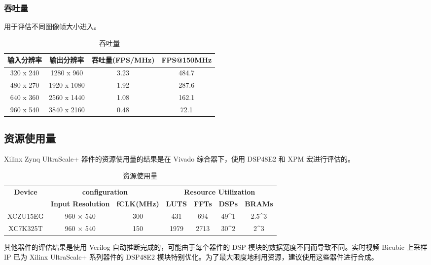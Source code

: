 \documentclass[12pt, a4paper, oneside]{ctexbook}
\begin{document}
	\subsubsection{吞吐量}
	用于评估不同图像帧大小进入。
	\begin{table}[h]
		\centering
		\begin{tabular}{|c|c|c|c|}
			\hline
			\textbf{输入分辨率} & \textbf{输出分辨率} & \textbf{吞吐量(FPS/MHz)} & \textbf{FPS@150MHz} \\ \hline
			320 x 240      & 1280 x 960     & 3.23                  & 484.7               \\ \hline
			480 x 270      & 1920 x 1080    & 1.92                  & 287.6               \\ \hline
			640 x 360      & 2560 x 1440    & 1.08                  & 162.1               \\ \hline
			960 x 540      & 3840 x 2160    & 0.48                  & 72.1                \\ \hline
		\end{tabular}
		\caption{吞吐量}
	\end{table}
	\subsection{资源使用量}
	Xilinx Zynq UltraScale+ 器件的资源使用量的结果是在 Vivado 综合器下，使用 DSP48E2 和 XPM 宏进行评估的。
	\par	
	\begin{table}[h]
		\begin{tabular}{|c|cc|cccc|}
			\hline
			\multirow{2}{*}{\textbf{Device}} & \multicolumn{2}{c|}{\textbf{configuration}}                         & \multicolumn{4}{c|}{\textbf{Resource Utilization}}                                                                                            \\ \cline{2-7} 
			& \multicolumn{1}{c|}{\textbf{Input Resolution}} & \textbf{fCLK(MHz)} & \multicolumn{1}{c|}{\textbf{LUTS}} & \multicolumn{1}{c|}{\textbf{FFTs}} & \multicolumn{1}{c|}{\textbf{DSPs}}         & \textbf{BRAMs}         \\ \hline
			XCZU15EG                         & \multicolumn{1}{c|}{960 × 540}                 & 300                & \multicolumn{1}{c|}{431}           & \multicolumn{1}{c|}{694}           & \multicolumn{1}{c|}{49\textasciicircum{}1} & 2.5\textasciicircum{}3 \\ \hline
			XC7K325T                         & \multicolumn{1}{c|}{960 × 540}                 & 150                & \multicolumn{1}{c|}{1979}          & \multicolumn{1}{c|}{2713}          & \multicolumn{1}{c|}{30\textasciicircum{}2} & 2\textasciicircum{}3   \\ \hline
		\end{tabular}
		\caption{资源使用量}
	\end{table}
	其他器件的评估结果是使用 Verilog 自动推断完成的，可能由于每个器件的 DSP 模块的数据宽度不同而导致不同。实时视频 Bicubic 上采样 IP 已为 Xilinx UltraScale+ 系列器件的 DSP48E2 模块特别优化。为了最大限度地利用资源，建议使用这些器件进行合成。
	
\end{document}
